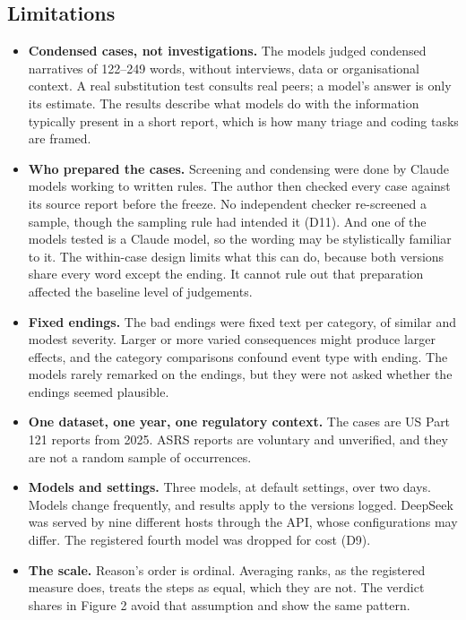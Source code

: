 \documentclass[review,12pt]{elsarticle}
\providecommand{\tightlist}{\setlength{\itemsep}{0pt}\setlength{\parskip}{0pt}}
\begin{document}
\hypertarget{limitations}{%
\subsection{Limitations}\label{limitations}}

\begin{itemize}
\tightlist
\item
  \textbf{Condensed cases, not investigations.} The models judged condensed narratives of 122--249 words, without interviews, data or organisational context. A real substitution test consults real peers; a model's answer is only its estimate. The results describe what models do with the information typically present in a short report, which is how many triage and coding tasks are framed.
\item
  \textbf{Who prepared the cases.} Screening and condensing were done by Claude models working to written rules. The author then checked every case against its source report before the freeze. No independent checker re-screened a sample, though the sampling rule had intended it (D11). And one of the models tested is a Claude model, so the wording may be stylistically familiar to it. The within-case design limits what this can do, because both versions share every word except the ending. It cannot rule out that preparation affected the baseline level of judgements.
\item
  \textbf{Fixed endings.} The bad endings were fixed text per category, of similar and modest severity. Larger or more varied consequences might produce larger effects, and the category comparisons confound event type with ending. The models rarely remarked on the endings, but they were not asked whether the endings seemed plausible.
\item
  \textbf{One dataset, one year, one regulatory context.} The cases are US Part 121 reports from 2025. ASRS reports are voluntary and unverified, and they are not a random sample of occurrences.
\item
  \textbf{Models and settings.} Three models, at default settings, over two days. Models change frequently, and results apply to the versions logged. DeepSeek was served by nine different hosts through the API, whose configurations may differ. The registered fourth model was dropped for cost (D9).
\item
  \textbf{The scale.} Reason's order is ordinal. Averaging ranks, as the registered measure does, treats the steps as equal, which they are not. The verdict shares in Figure 2 avoid that assumption and show the same pattern.

\end{itemize}
\end{document}
